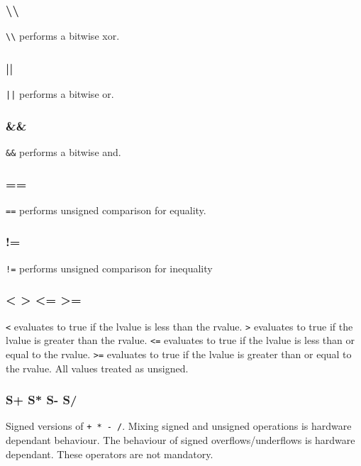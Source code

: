 \subsubsection{\textbackslash\textbackslash}

\verb|\\| performs a bitwise xor.

\subsubsection{||}

\verb+||+ performs a bitwise or.

\subsubsection{\&\&}

\verb|&&| performs a bitwise and. 

\subsubsection{==}

\verb|==| performs unsigned comparison for equality.

\subsubsection{!=}

\verb|!=| performs unsigned comparison for inequality

\subsubsection{< > <= >=}

\verb|<| evaluates to true if the lvalue is less than the rvalue. \verb|>| evaluates to true if the lvalue is greater than the rvalue. 
\verb|<=| evaluates to true if the lvalue is less than or equal to the rvalue. \verb|>=| evaluates to true if the lvalue is greater than or equal to the rvalue. 
All values treated as unsigned. 

\subsubsection{S+ S* S- S/}

Signed versions of \verb|+ * - /|. Mixing signed and unsigned operations is hardware dependant behaviour. The behaviour of signed overflows/underflows is hardware dependant. 
These operators are not mandatory.

